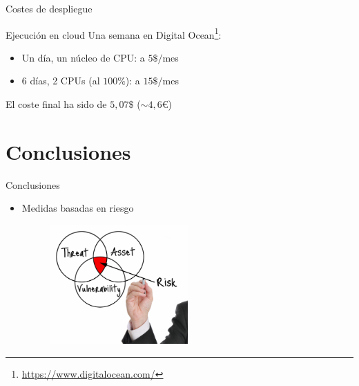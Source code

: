 \documentclass{beamer}
\begin{document}
\begin{frame}{Costes de despliegue}

    \begin{block}{Ejecución en cloud}
        Una semana en Digital Ocean\footnote{\url{https://www.digitalocean.com/}}:
        \begin{itemize}
            \item Un día, un núcleo de CPU:     a $5\$/$mes
            \item 6 días, 2 CPUs (al $100\%$):  a $15\$/$mes
        \end{itemize}
        El coste final ha sido de $5,07\$$ ($\sim4,6$\euro)
    \end{block}   
    
\end{frame}

\section{Conclusiones}


\begin{frame}{Conclusiones}
    \begin{itemize}
        \item Medidas basadas en riesgo
        \begin{figure}[H]
            \centering\includegraphics[width=0.5\textwidth]{arr}
        \end{figure}
    \end{itemize}
\end{frame}
\end{document}
